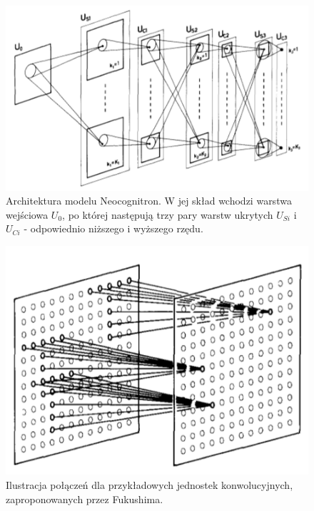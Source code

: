 \documentclass[12pt,a4paper,twoside]{article}
\begin{document}
\begin{figure}[h]
  \centering
\includegraphics[scale=0.7]{../obrazy/fig:neocognitron.png}
\caption{Architektura modelu Neocognitron. W jej skład wchodzi warstwa wejściowa \(U_0\), po której następują trzy pary warstw ukrytych \(U_{Si} \) i \(U_{Ci} \) - odpowiednio niższego i wyższego rzędu. \label{fig:neocognitron}}
\end{figure}

\begin{figure}[h]
  \centering
\includegraphics[scale=0.5]{../obrazy/fig:convolution.png}
\caption{Ilustracja połączeń dla przykładowych jednostek konwolucyjnych, zaproponowanych przez Fukushima. \label{fig:convolution}}
\end{figure}
\end{document}
